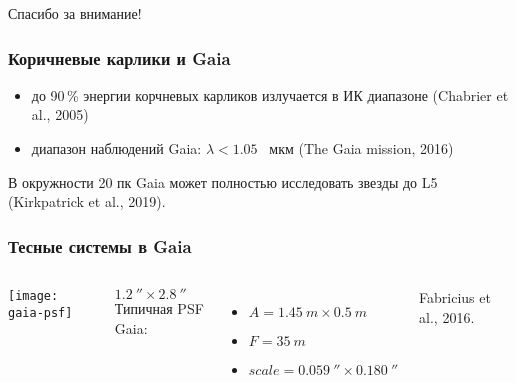 



\begin{frame}
Спасибо за внимание!
\end{frame}



\begin{frame}
\frametitle{Коричневые карлики и Gaia}
\begin{itemize}
 \item до 90\,\% энергии корчневых карликов излучается в ИК диапазоне (Chabrier et al., 2005)
 \item диапазон наблюдений Gaia: $\lambda <1.05$~ мкм (The Gaia mission, 2016)
\end{itemize}
В окружности 20 пк Gaia может полностью исследовать звезды до L5 (Kirkpatrick et al., 2019).
\end{frame}

\begin{frame}
\frametitle{Тесные системы в Gaia}
\begin{columns}
\texttt{[image: gaia-psf]}
{\footnotesize $1.2~'' \times 2.8~''$ \\

Типичная PSF Gaia:
\begin{itemize}
   \item $A=1.45~m\times0.5~m$
   \item $F= 35~m$
   \item $scale=0.059~'' \times 0.180~''$
\end{itemize}
Fabricius et al., 2016.}
\end{columns}
\end{frame}



